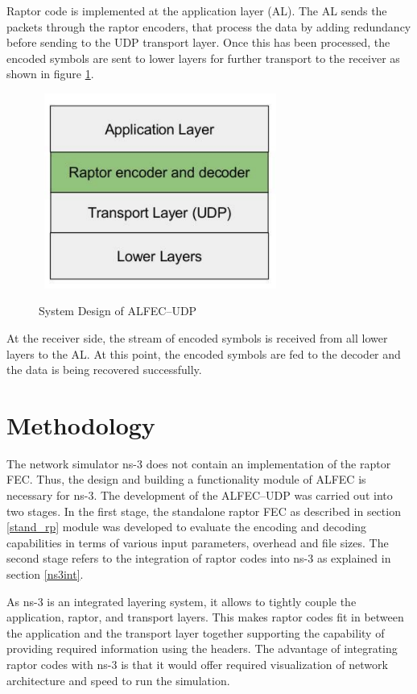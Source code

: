Raptor code is implemented at the application layer (AL). The AL sends the packets through the raptor encoders, that process the data by adding redundancy before sending to the UDP transport layer. Once this has been processed, the encoded symbols are sent to lower layers for further transport to the receiver as shown in figure \ref{sys_design1}.
\begin{figure}[!htbp]
\begin{center}
\mbox{
\includegraphics[width=3.0in]{Figures/sys_design}}
\caption{System Design of ALFEC--UDP}
\label{sys_design1}
\end{center}
\end{figure}
At the receiver side, the stream of encoded symbols is received from all lower layers to the AL. At this point, the encoded symbols are fed to the decoder and the data is being recovered successfully.

\section{Methodology}
\label{methodology_}
The network simulator ns-3 does not contain an implementation of the raptor FEC. Thus, the design and building a functionality module of ALFEC is necessary for ns-3. The development of the ALFEC--UDP was carried out into two stages. In the first stage, the standalone raptor FEC as described in section \ref{stand_rp} module was developed to evaluate the encoding and decoding capabilities in terms of various input parameters, overhead and file sizes. The second stage refers to the integration of raptor codes into ns-3 as explained in section \ref{ns3int}. 

As ns-3 is an integrated layering system, it allows to tightly couple the application, raptor, and transport layers. This makes raptor codes fit in between the application and the transport layer together supporting the capability of providing required information using the headers. The advantage of integrating raptor codes with ns-3 is that it would offer required visualization of network architecture and speed to run the simulation. 

